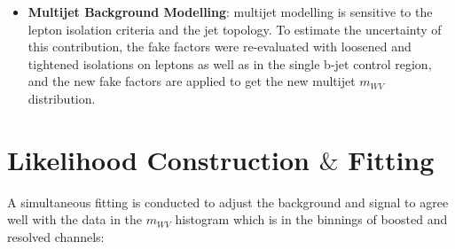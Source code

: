 \begin{itemize}
	\item{\bf Multijet Background Modelling}: multijet modelling is sensitive to the lepton isolation criteria and the jet topology. To estimate the uncertainty of this contribution, the fake factors were re-evaluated with loosened and tightened isolations on leptons as well as in the single b-jet control region, and the new fake factors are applied to get the new multijet $m_{WV}$ distribution.
\end{itemize}
\section{Likelihood Construction $\&$ Fitting}
A simultaneous fitting is conducted to adjust the background and signal to agree well with the data in the $m_{WV}$ histogram which is in the binnings of boosted and resolved channels:

